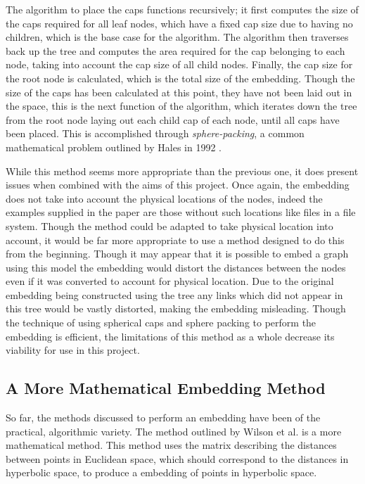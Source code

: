 The algorithm to place the caps functions recursively; it first computes the size of the caps required for all leaf nodes, which have a fixed cap size due to having no children, which is the base case for the algorithm. The algorithm then traverses back up the tree and computes the area required for the cap belonging to each node, taking into account the cap size of all child nodes. Finally, the cap size for the root node is calculated, which is the total size of the embedding. Though the size of the caps has been calculated at this point, they have not been laid out in the space, this is the next function of the algorithm, which iterates down the tree from the root node laying out each child cap of each node, until all caps have been placed. This is accomplished through \textit{sphere-packing}, a common mathematical problem outlined by Hales in 1992 \cite{hales_sphere_1992}.

While this method seems more appropriate than the previous one, it does present issues when combined with the aims of this project. Once again, the embedding does not take into account the physical locations of the nodes, indeed the examples supplied in the paper are those without such locations like files in a file system. Though the method could be adapted to take physical location into account, it would be far more appropriate to use a method designed to do this from the beginning. Though it may appear that it is possible to embed a graph using this model the embedding would distort the distances between the nodes even if it was converted to account for physical location. Due to the original embedding being constructed using the tree any links which did not appear in this tree would be vastly distorted, making the embedding misleading. Though the technique of using spherical caps and sphere packing to perform the embedding is efficient, the limitations of this method as a whole decrease its viability for use in this project.

\subsection{A More Mathematical Embedding Method}
\label{sec:hyperbolic_embedding}

So far, the methods discussed to perform an embedding have been of the practical, algorithmic variety. The method outlined by Wilson et al. \cite{wilson_spherical_2014} is a more mathematical method. This method uses the matrix describing the distances between points in Euclidean space, which should correspond to the distances in hyperbolic space, to produce a embedding of points in hyperbolic space.


